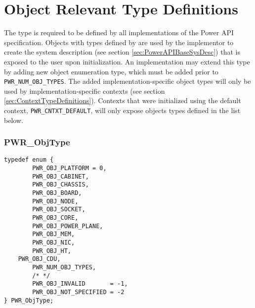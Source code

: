 \section{Object Relevant Type Definitions}\label{sec:ObjectTypeDefinitions}

The  type is required to be defined by all implementations of the Power API specification. 
Objects with types defined by  are used by the implementor to create the system description (see section \ref{sec:PowerAPIBaseSysDesc}) that is exposed to the user upon initialization.
An implementation may extend this type by adding new object enumeration type, which must be added prior to \texttt{PWR_NUM_OBJ_TYPES}.
The added implementation-specific object types will only be used by implementation-specific contexts (see section \ref{sec:ContextTypeDefinitions}).
Contexts that were initialized using the default context, \texttt{PWR_CNTXT_DEFAULT}, will only expose objects types defined in the list below.


\subsubsection{PWR_ObjType}\label{type:ObjType}
\begin{center}
\begin{minipage}{.95\linewidth}%
\begin{lstlisting}
typedef enum {
        PWR_OBJ_PLATFORM = 0,
        PWR_OBJ_CABINET,
        PWR_OBJ_CHASSIS,
        PWR_OBJ_BOARD,
        PWR_OBJ_NODE,
        PWR_OBJ_SOCKET,
        PWR_OBJ_CORE,
        PWR_OBJ_POWER_PLANE,
        PWR_OBJ_MEM,
        PWR_OBJ_NIC,
        PWR_OBJ_HT,
	PWR_OBJ_CDU,
        PWR_NUM_OBJ_TYPES,
        /* */
        PWR_OBJ_INVALID       = -1,
        PWR_OBJ_NOT_SPECIFIED = -2
} PWR_ObjType;
\end{lstlisting}
\end{minipage}
\end{center}




